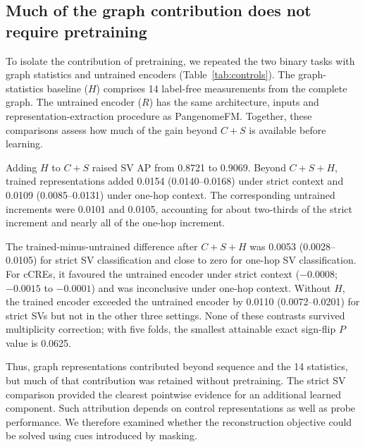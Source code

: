 \documentclass[11pt]{article}
\newcommand{\method}{PangenomeFM\xspace}
\begin{document}
\begin{bibunit}[unsrtnat]
\subsection{Much of the graph contribution does not require pretraining}
\label{sec:controls-result}

To isolate the contribution of pretraining, we repeated the two binary tasks with graph statistics and untrained encoders (Table~\ref{tab:controls}). The graph-statistics baseline ($H$) comprises 14 label-free measurements from the complete graph. The untrained encoder ($R$) has the same architecture, inputs and representation-extraction procedure as \method. Together, these comparisons assess how much of the gain beyond $C+S$ is available before learning.

Adding $H$ to $C+S$ raised SV AP from 0.8721 to 0.9069. Beyond $C+S+H$, trained representations added 0.0154 (0.0140--0.0168) under strict context and 0.0109 (0.0085--0.0131) under one-hop context. The corresponding untrained increments were 0.0101 and 0.0105, accounting for about two-thirds of the strict increment and nearly all of the one-hop increment.

The trained-minus-untrained difference after $C+S+H$ was 0.0053 (0.0028--0.0105) for strict SV classification and close to zero for one-hop SV classification. For cCREs, it favoured the untrained encoder under strict context ($-0.0008$; $-0.0015$ to $-0.0001$) and was inconclusive under one-hop context. Without $H$, the trained encoder exceeded the untrained encoder by 0.0110 (0.0072--0.0201) for strict SVs but not in the other three settings. None of these contrasts survived multiplicity correction; with five folds, the smallest attainable exact sign-flip $P$ value is 0.0625.

Thus, graph representations contributed beyond sequence and the 14 statistics, but much of that contribution was retained without pretraining. The strict SV comparison provided the clearest pointwise evidence for an additional learned component. Such attribution depends on control representations as well as probe performance\cite{hewitt2019control}. We therefore examined whether the reconstruction objective could be solved using cues introduced by masking.


\end{bibunit}
\end{document}
